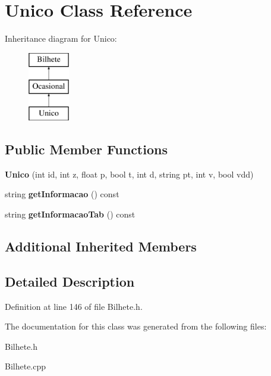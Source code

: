 \hypertarget{classUnico}{}\section{Unico Class Reference}
\label{classUnico}
Inheritance diagram for Unico\+:\begin{figure}[H]
\begin{center}
\leavevmode
\includegraphics[height=3.000000cm]{classUnico}
\end{center}
\end{figure}
\subsection*{Public Member Functions}
\begin{DoxyCompactItemize}
\item 
\mbox{\label{classUnico_a60affd8166fce63b3c85b5148577205a}} 
{\bfseries Unico} (int id, int z, float p, bool t, int d, string pt, int v, bool vdd)
\item 
\mbox{\label{classUnico_a3c41c1152140bc944a6bea2e2cee3ffb}} 
string {\bfseries get\+Informacao} () const
\item 
\mbox{\label{classUnico_aafb8e1869fe41931ab1738bb8398dbf1}} 
string {\bfseries get\+Informacao\+Tab} () const
\end{DoxyCompactItemize}
\subsection*{Additional Inherited Members}


\subsection{Detailed Description}


Definition at line 146 of file Bilhete.\+h.



The documentation for this class was generated from the following files\+:\begin{DoxyCompactItemize}
\item 
Bilhete.\+h\item 
Bilhete.\+cpp\end{DoxyCompactItemize}
